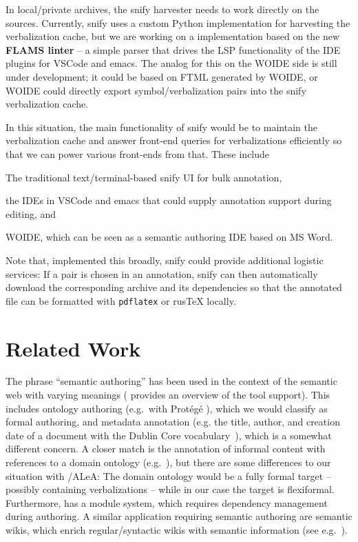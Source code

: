 \documentclass[runningheads]{llncs}
\newcommand\ALeA{\textsf{ALeA}\xspace}
\newcommand\snify{\textsf{snify}\xspace}
\newcommand\FTML{\textsf{FTML}\xspace}
\newcommand\WOIDE{\textsf{WOIDE}\xspace}
\def\flams{\textsf{FLAMS}\xspace}
\begin{document}
In local/private archives, the \snify harvester needs to work directly on the \sTeX
sources.
Currently, \snify uses a custom Python implementation for harvesting the verbalization cache,
but we are working on a implementation based on the new \textbf{\flams linter} -- a simple \sTeX parser that
drives the LSP functionality of the \sTeX IDE plugins for \textsf{VSCode} and \textsf{emacs}.
The analog for this on the \WOIDE side is still under development; it
could be based on \FTML generated by \WOIDE, or \WOIDE could directly export symbol/verbalization
pairs into the \snify verbalization cache.

In this situation, the main functionality of \snify would be to maintain the verbalization cache
and answer front-end queries for verbalizations efficiently so that we can power various
front-ends from that. These include
\begin{compactenum}[\em i\rm)]
\item The traditional text/terminal-based \snify UI for bulk annotation,
\item the \sTeX IDEs in \textsf{VSCode} and \textsf{emacs} that could supply annotation
  support during editing, and 
\item \WOIDE, which can be seen as a semantic authoring IDE based on MS Word.
\end{compactenum}

Note that, implemented this broadly, \snify could provide additional logistic services: If a
pair is chosen in an annotation, \snify can then automatically download the corresponding
archive and its dependencies so that the annotated file can be formatted with \texttt{pdflatex} or
\textsf{rus\TeX} locally.

\section{Related Work}\label{sec:relwork}
The phrase ``semantic authoring'' has been used in the
context of the semantic web with varying meanings
(\cite{khalili2013user} provides an overview of the tool support).
This includes ontology authoring (e.g.\ with \textsf{Prot{\'e}g{\'e}}
\cite{musen2015protege}), which we would classify as
formal authoring, and metadata annotation
(e.g. the title, author, and creation date of a document with the Dublin Core vocabulary~\cite{DublinCore:on}),
which is a somewhat different concern.
A closer match is the annotation of
informal content with references to a domain ontology (e.g.\ \cite{goerz2010adaptation}),
but there are some differences to
our situation with \sTeX/\ALeA: The domain ontology would be a fully formal target --
possibly containing verbalizations -- while in our case the target is flexiformal.
Furthermore, \sTeX has a module system, which requires dependency management during
authoring.
A similar application requiring semantic authoring
are semantic wikis, which enrich regular/syntactic
wikis with semantic information
(see e.g.\ \cite{semmediawiki}).
\end{document}
